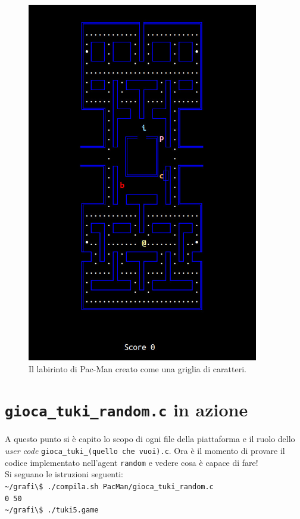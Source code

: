 \documentclass[8pt]{book}
\begin{document}
\begin{figure}
  \centering
  \includegraphics[width=0.9\textwidth]{img/tuki5_campo.jpg}
  \caption{Il labirinto di Pac-Man creato come una griglia di caratteri.}
  \label{labTerminale}
\end{figure}

\section{\texttt{gioca\_tuki\_random.c} in azione}

A questo punto si è capito lo scopo di ogni file della piattaforma e il ruolo dello \emph{user code} \texttt{gioca\_tuki\_(quello che vuoi).c}. Ora è il momento di provare il codice implementato nell'agent \texttt{random} e vedere cosa è capace di fare!\\
Si seguano le istruzioni seguenti:\\
\newline
\texttt{\textasciitilde{}/grafi\textbackslash{}\$ ./compila.sh PacMan/gioca\_tuki\_random.c\\ 0 50}\\
\texttt{\textasciitilde{}/grafi\textbackslash{}\$ ./tuki5.game}\\
\end{document}
